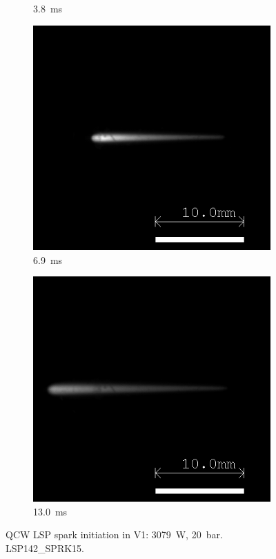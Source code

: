 \begin{figure}[!ht]
\begin{subfigure}[t]{0.3\textwidth}
        \caption{\qty{3.8}{ms}}
    \end{subfigure}
    \hfill
    \begin{subfigure}[t]{0.3\textwidth}
        \centering
        \includegraphics[width=\textwidth]{assets/4 experiments/V1 Spark Ignition Frames/LSP142_SPRK15_Fr69.png}
        \caption{\qty{6.9}{ms}}
    \end{subfigure}
    \hfill
    \begin{subfigure}[t]{0.3\textwidth}
        \centering
        \includegraphics[width=\textwidth]{assets/4 experiments/V1 Spark Ignition Frames/LSP142_SPRK15_Fr130.png}
        \caption{\qty{13.0}{ms}}
    \end{subfigure}
    \caption{QCW LSP spark initiation in V1: \qty{3079}{W}, \qty{20}{bar}. LSP142\_SPRK15.}
    \label{fig:V1_spark_initiation_frames}
\end{figure}